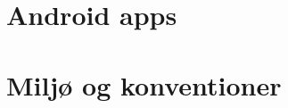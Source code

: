 	\graphicspath{{sections/java/1/figures/}}
	
	
	\graphicspath{{sections/java/2/figures/}}
	
	
	\graphicspath{{sections/java/3/figures/}}
	
	
	\part{Android apps}
	
	\graphicspath{{sections/android/layouts/figures/}}
	
	
	\graphicspath{{sections/android/activities/figures/}}
	
	
	\graphicspath{{sections/android/animations/figures/}}
	
	
	\part{Miljø og konventioner}
	
	\graphicspath{{sections/ekstra/studio/figures/}}
	
	
	
	\graphicspath{{figures/}}
	
	\ifdraftmode
		\glsaddall
	\fi
	\printglossary
	
	
	
	


